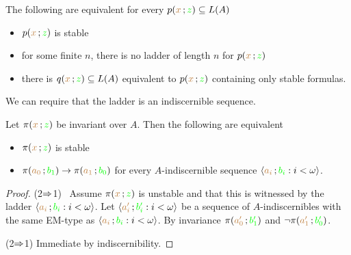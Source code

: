 \begin{fact}\label{}
  The following are equivalent for every $p({\color{brown} x}\,;{\color{green} z})\subseteq L(A)$
  \begin{itemize}
    \item [1.] $p({\color{brown} x}\,;{\color{green} z})$ is stable
    \item [1.] for some finite $n$, there is no ladder of length $n$ for $p({\color{brown} x}\,;{\color{green} z})$
    \item [2.] there is $q({\color{brown} x}\,;{\color{green} z})\subseteq L(A)$ equivalent to $p({\color{brown} x}\,;{\color{green} z})$ containing only stable formulas.
  \end{itemize}
\end{fact}

We can require that the ladder is an indiscernible sequence. 

\begin{theorem}\label{thm_sability_indiscernibility}
  Let $\pi({\color{brown} x}\,;{\color{green} z})$ be invariant over $A$.
  Then the following are equivalent
  \begin{itemize}
    \item[1.] $\pi({\color{brown} x}\,;{\color{green} z})$ is stable
    \item[2.] $\pi({\color{brown} a_0}\,;{\color{green} b_1})\rightarrow\pi({\color{brown} a_1}\,;{\color{green} b_0})$ for every $A$-indiscernible sequence $\langle{\color{brown}a_i}\,;{\color{green} b_i} : i<\omega\rangle$.
  \end{itemize}
\end{theorem}

\begin{proof}
  (2$\Rightarrow$1) \ Assume $\pi({\color{brown} x}\,;{\color{green} z})$ is unstable and that this is witnessed by the ladder $\langle{\color{brown}a_i}\,;{\color{green} b_i} : i<\omega\rangle$.
  Let $\langle{\color{brown}a'_i}\,;{\color{green} b'_i} : i<\omega\rangle$ be a sequence of $A$-indiscernibles with the same EM-type as $\langle{\color{brown}a_i}\,;{\color{green} b_i} : i<\omega\rangle$.
  By invariance $\pi({\color{brown} a'_0}\,;{\color{green} b'_1})$ and $\neg\pi({\color{brown} a'_1}\,;{\color{green} b'_0})$.

  (2$\Rightarrow$1) Immediate by indiscernibility.
\end{proof}


